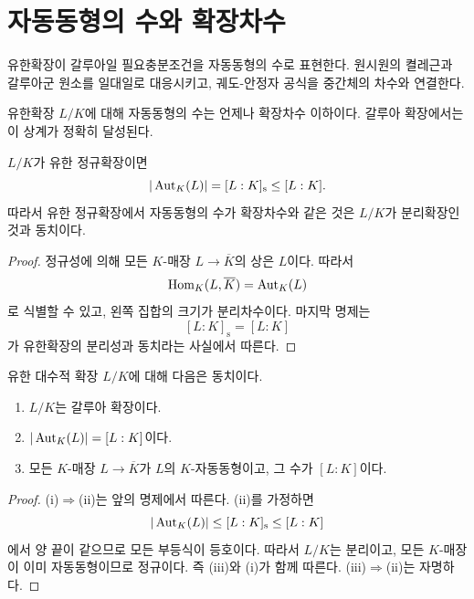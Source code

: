 \clearpage
\section{자동동형의 수와 확장차수}
\label{sec:galois-degree-automorphisms}

\begin{learninggoal}
유한확장이 갈루아일 필요충분조건을 자동동형의 수로 표현한다. 원시원의 켤레근과 갈루아군 원소를 일대일로 대응시키고, 궤도-안정자 공식을 중간체의 차수와 연결한다.
\end{learninggoal}

유한확장 $L/K$에 대해 자동동형의 수는 언제나 확장차수 이하이다. 갈루아 확장에서는 이 상계가 정확히 달성된다.

\begin{proposition}
$L/K$가 유한 정규확장이면
\[
  |\operatorname{Aut}_K(L)|=[L:K]_{\mathrm s}\le [L:K].
\]
따라서 유한 정규확장에서 자동동형의 수가 확장차수와 같은 것은 $L/K$가 분리확장인 것과 동치이다.
\end{proposition}

\begin{proof}
정규성에 의해 모든 $K$-매장 $L\to\overline K$의 상은 $L$이다. 따라서
\[
  \operatorname{Hom}_K(L,\overline K)=\operatorname{Aut}_K(L)
\]
로 식별할 수 있고, 왼쪽 집합의 크기가 분리차수이다. 마지막 명제는
\[
  [L:K]_{\mathrm s}=[L:K]
\]
가 유한확장의 분리성과 동치라는 사실에서 따른다.
\end{proof}

\begin{theorem}
유한 대수적 확장 $L/K$에 대해 다음은 동치이다.
\begin{enumerate}[label=(\roman*)]
  \item $L/K$는 갈루아 확장이다.
  \item $|\operatorname{Aut}_K(L)|=[L:K]$이다.
  \item 모든 $K$-매장 $L\to\overline K$가 $L$의 $K$-자동동형이고, 그 수가 $[L:K]$이다.
\end{enumerate}
\end{theorem}

\begin{proof}
(i)$\Rightarrow$(ii)는 앞의 명제에서 따른다. (ii)를 가정하면
\[
  |\operatorname{Aut}_K(L)|
  \le [L:K]_{\mathrm s}
  \le [L:K]
\]
에서 양 끝이 같으므로 모든 부등식이 등호이다. 따라서 $L/K$는 분리이고, 모든 $K$-매장이 이미 자동동형이므로 정규이다. 즉 (iii)와 (i)가 함께 따른다. (iii)$\Rightarrow$(ii)는 자명하다.
\end{proof}

